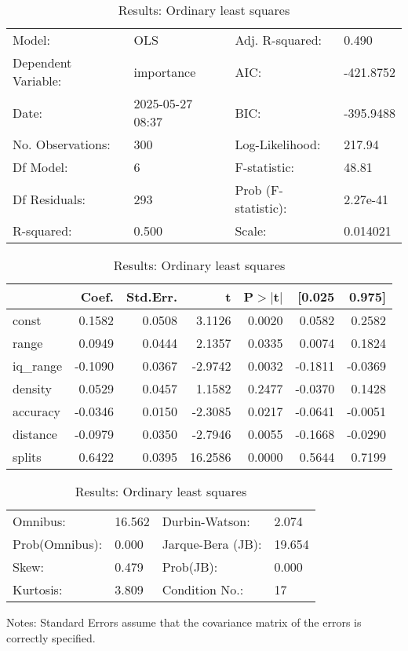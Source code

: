 \begin{table}
\caption{Results: Ordinary least squares}
\label{}
\begin{center}
\begin{tabular}{llll}
\hline
Model:              & OLS              & Adj. R-squared:     & 0.490      \\
Dependent Variable: & importance       & AIC:                & -421.8752  \\
Date:               & 2025-05-27 08:37 & BIC:                & -395.9488  \\
No. Observations:   & 300              & Log-Likelihood:     & 217.94     \\
Df Model:           & 6                & F-statistic:        & 48.81      \\
Df Residuals:       & 293              & Prob (F-statistic): & 2.27e-41   \\
R-squared:          & 0.500            & Scale:              & 0.014021   \\
\hline
\end{tabular}
\end{center}

\begin{center}
\begin{tabular}{lrrrrrr}
\hline
          &   Coef. & Std.Err. &       t & P$> |$t$|$ &  [0.025 &  0.975]  \\
\hline
const     &  0.1582 &   0.0508 &  3.1126 &      0.0020 &  0.0582 &  0.2582  \\
range     &  0.0949 &   0.0444 &  2.1357 &      0.0335 &  0.0074 &  0.1824  \\
iq\_range & -0.1090 &   0.0367 & -2.9742 &      0.0032 & -0.1811 & -0.0369  \\
density   &  0.0529 &   0.0457 &  1.1582 &      0.2477 & -0.0370 &  0.1428  \\
accuracy  & -0.0346 &   0.0150 & -2.3085 &      0.0217 & -0.0641 & -0.0051  \\
distance  & -0.0979 &   0.0350 & -2.7946 &      0.0055 & -0.1668 & -0.0290  \\
splits    &  0.6422 &   0.0395 & 16.2586 &      0.0000 &  0.5644 &  0.7199  \\
\hline
\end{tabular}
\end{center}

\begin{center}
\begin{tabular}{llll}
\hline
Omnibus:       & 16.562 & Durbin-Watson:    & 2.074   \\
Prob(Omnibus): & 0.000  & Jarque-Bera (JB): & 19.654  \\
Skew:          & 0.479  & Prob(JB):         & 0.000   \\
Kurtosis:      & 3.809  & Condition No.:    & 17      \\
\hline
\end{tabular}
\end{center}
\end{table}
\bigskip
Notes: \newline 
[1] Standard Errors assume that the covariance matrix of the errors is correctly specified.